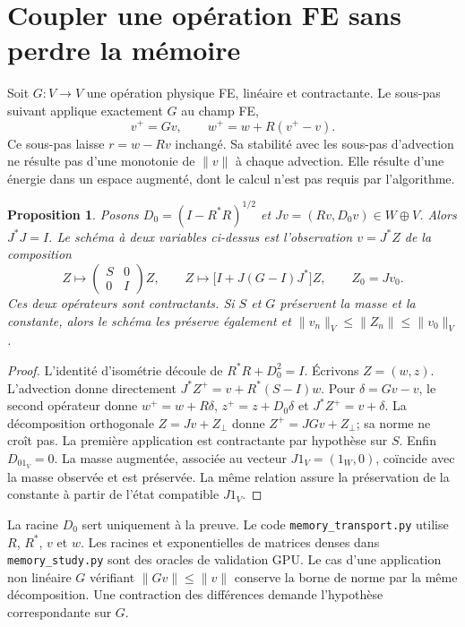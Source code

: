 \documentclass[11pt,a4paper]{article}
\newtheorem{proposition}{Proposition}
\newcommand{\id}{I}
\begin{document}
\section{Coupler une opération FE sans perdre la mémoire}
Soit $G:V\to V$ une opération physique FE, linéaire et contractante.
Le sous-pas suivant applique exactement $G$ au champ FE,
\[
 v^+=Gv,\qquad w^+=w+R(v^+-v).
\]
Ce sous-pas laisse $r=w-Rv$ inchangé.
Sa stabilité avec les sous-pas d'advection ne résulte pas d'une monotonie
de $\|v\|$ à chaque advection. Elle résulte d'une énergie dans un espace
augmenté, dont le calcul n'est pas requis par l'algorithme.

\begin{proposition}
Posons $D_0=(\id-R^*R)^{1/2}$ et
$Jv=(Rv,D_0v)\in W\oplus V$.
Alors $J^*J=\id$. Le schéma à deux variables ci-dessus est l'observation
$v=J^*Z$ de la composition
\[
 Z\longmapsto
 \begin{pmatrix} S&0\\0&\id\end{pmatrix}Z,
 \qquad
 Z\longmapsto \bigl[\id+J(G-\id)J^*\bigr]Z,
 \qquad Z_0=Jv_0 .
\]
Ces deux opérateurs sont contractants. Si $S$ et $G$ préservent la masse et
la constante, alors le schéma les préserve également et
$\|v_n\|_V\leq\|Z_n\|\leq\|v_0\|_V$.
\end{proposition}
\begin{proof}
L'identité d'isométrie découle de
$R^*R+D_0^2=\id$. Écrivons $Z=(w,z)$.
L'advection donne directement
$J^*Z^+=v+R^*(S-\id)w$.
Pour $\delta=Gv-v$, le second opérateur donne
$w^+=w+R\delta$, $z^+=z+D_0\delta$ et
$J^*Z^+=v+\delta$.
La décomposition orthogonale
$Z=Jv+Z_\perp$ donne
$Z^+=JGv+Z_\perp$; sa norme ne croît pas.
La première application est contractante par hypothèse sur $S$.
Enfin $D_01_V=0$. La masse augmentée, associée au vecteur
$J1_V=(1_W,0)$, coïncide avec la masse observée et est préservée.
La même relation assure la préservation de la constante à partir
de l'état compatible $J1_V$.
\end{proof}

La racine $D_0$ sert uniquement à la preuve. Le code
\texttt{memory\_transport.py} utilise $R$, $R^*$, $v$ et $w$.
Les racines et exponentielles de matrices denses dans
\texttt{memory\_study.py} sont des oracles de validation GPU.
Le cas d'une application non linéaire $G$ vérifiant
$\|Gv\|\leq\|v\|$ conserve la borne de norme par la même décomposition.
Une contraction des différences demande l'hypothèse correspondante sur $G$.
\end{document}
